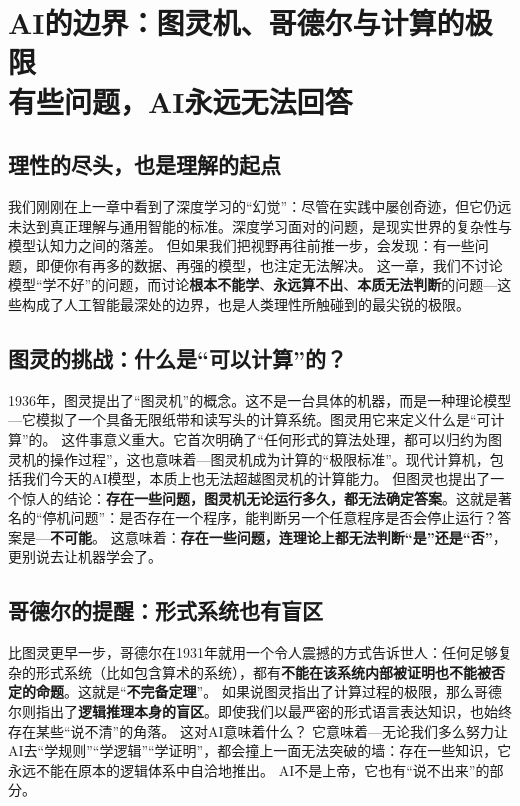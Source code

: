  \chapter{AI的边界：图灵机、哥德尔与计算的极限 \texorpdfstring{\\}{ }有些问题，AI永远无法回答}
\section*{理性的尽头，也是理解的起点}
我们刚刚在上一章中看到了深度学习的“幻觉”：尽管在实践中屡创奇迹，但它仍远未达到真正理解与通用智能的标准。深度学习面对的问题，是现实世界的复杂性与模型认知力之间的落差。
但如果我们把视野再往前推一步，会发现：有一些问题，即便你有再多的数据、再强的模型，也注定无法解决。
这一章，我们不讨论模型“学不好”的问题，而讨论\textbf{根本不能学}、\textbf{永远算不出}、\textbf{本质无法判断}的问题---这些构成了人工智能最深处的边界，也是人类理性所触碰到的最尖锐的极限。
\section*{图灵的挑战：什么是“可以计算”的？}
1936年，图灵提出了“图灵机”的概念。这不是一台具体的机器，而是一种理论模型---它模拟了一个具备无限纸带和读写头的计算系统。图灵用它来定义什么是“可计算”的。
这件事意义重大。它首次明确了“任何形式的算法处理，都可以归约为图灵机的操作过程”，这也意味着---图灵机成为计算的“极限标准”。现代计算机，包括我们今天的AI模型，本质上也无法超越图灵机的计算能力。
但图灵也提出了一个惊人的结论：\textbf{存在一些问题，图灵机无论运行多久，都无法确定答案}。这就是著名的“停机问题”：是否存在一个程序，能判断另一个任意程序是否会停止运行？答案是---\textbf{不可能}。
这意味着：\textbf{存在一些问题，连理论上都无法判断“是”还是“否”}，更别说去让机器学会了。
\section*{哥德尔的提醒：形式系统也有盲区}
比图灵更早一步，哥德尔在1931年就用一个令人震撼的方式告诉世人：任何足够复杂的形式系统（比如包含算术的系统），都有\textbf{不能在该系统内部被证明也不能被否定的命题}。这就是“\textbf{不完备定理}”。
如果说图灵指出了计算过程的极限，那么哥德尔则指出了\textbf{逻辑推理本身的盲区}。即使我们以最严密的形式语言表达知识，也始终存在某些“说不清”的角落。
这对AI意味着什么？
它意味着---无论我们多么努力让AI去“学规则”“学逻辑”“学证明”，都会撞上一面无法突破的墙：存在一些知识，它永远不能在原本的逻辑体系中自洽地推出。
AI不是上帝，它也有“说不出来”的部分。
